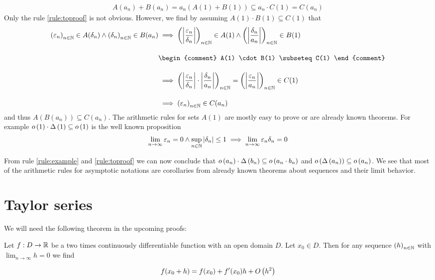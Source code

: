 \begin{align}
  A(a_n) + B(a_n) = a_n (A(1)+B(1)) \subseteq a_n \cdot C(1) = C(a_n)
\end{align}
Only the rule \ref{rule:toproof} is not obvious. However, we find by assuming $A(1) \cdot B(1) \subseteq C(1)$ that
\begin{align}
  \seq{\epsilon_n} \in A(\delta_n) \land \seq{\delta_n} \in B(a_n) & \implies \seq{\abs{\frac{\epsilon_n}{\delta_n}}} \in A(1) \land \seq{\abs{\frac{\delta_n}{a_n}}} \in B(1) \bnl
  &
  \begin{comment}
    A(1) \cdot B(1) \subseteq C(1)
  \end{comment} \bnl
  & \implies \seq{\abs{\frac{\epsilon_n}{\delta_n}} \cdot \abs{\frac{\delta_n}{a_n}}} = \seq{\abs{\frac{\epsilon_n}{a_n}}} \in C(1) \bnl
  & \implies \seq{\epsilon_n} \in C(a_n)
\end{align}
and thus $A(B(a_n))\subseteq C(a_n)$. The arithmetic rules for sets $A(1)$ are mostly easy to prove or are already known theorems. For example $o\left( {1} \right)\cdot\Delta\left( {1} \right) \subseteq o\left( {1} \right)$ is the well known proposition
\begin{align}
  \lim_{n\to\infty} \varepsilon_n = 0 \land \sup_{n\in\mathbb N} \left|{\delta_n}\right| \le 1 \implies \lim_{n\to\infty} \varepsilon_n \delta_n = 0
\end{align}

From rule \ref{rule:example} and \ref{rule:toproof} we can now conclude that $o\left( {a_n} \right) \cdot \Delta\left( {b_n} \right) \subseteq o\left( {a_n \cdot b_n} \right)$ and $o\left( {\Delta\left( {a_n} \right)} \right) \subseteq o\left( {a_n} \right)$. We see that most of the arithmetic rules for asymptotic notations are corollaries from already known theorems about sequences and their limit behavior.

\section{Taylor series}

We will need the following theorem in the upcoming proofs:

\begin{theorem}
  Let $f:D\to\mathbb R$ be a two times continuously differentiable function with an open domain $D$. Let $x_0\in D$. Then for any sequence $\left({h}\right)_{{n}\in\mathbb N}$ with $\lim_{n\to\infty} h = 0$ we find

  \begin{align}
    f(x_0+h) = f(x_0) + f'(x_0) h + O\left( {h^2} \right)
  \end{align}
\end{theorem}

